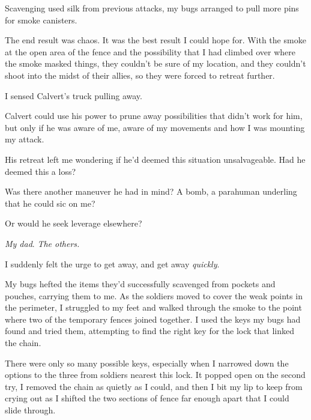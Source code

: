 Scavenging used silk from previous attacks, my bugs arranged to pull more pins for smoke canisters.



The end result was chaos.  It was the best result I could hope for.  With the smoke at the open area of the fence and the possibility that I had climbed over where the smoke masked things, they couldn't be sure of my location, and they couldn't shoot into the midst of their allies, so they were forced to retreat further.



I sensed Calvert's truck pulling away.



Calvert could use his power to prune away possibilities that didn't work for him, but only if he was aware of me, aware of my movements and how I was mounting my attack.



His retreat left me wondering if he'd deemed this situation unsalvageable.  Had he deemed this a loss?



Was there another maneuver he had in mind?  A bomb, a parahuman underling that he could sic on me?



Or would he seek leverage elsewhere?



\emph{My dad}.  \emph{The others.}



I suddenly felt the urge to get away, and get away \emph{quickly}.



My bugs hefted the items they'd successfully scavenged from pockets and pouches, carrying them to me.  As the soldiers moved to cover the weak points in the perimeter, I struggled to my feet and walked through the smoke to the point where two of the temporary fences joined together.  I used the keys my bugs had found and tried them, attempting to find the right key for the lock that linked the chain.



There were only so many possible keys, especially when I narrowed down the options to the three from soldiers nearest this lock.  It popped open on the second try, I removed the chain as quietly as I could, and then I bit my lip to keep from crying out as I shifted the two sections of fence far enough apart that I could slide through.




